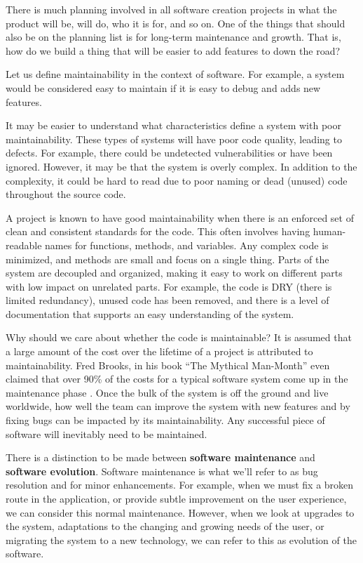 \documentclass[12pt,conference]{IEEEtran}
\begin{document}
There is much planning involved in all software creation projects in what the product will be, will do, who it is for, and so on. One of the things that should also be on the planning list is for long-term maintenance and growth. That is, how do we build a thing that will be easier to add features to down the road?

Let us define maintainability in the context of software. For example, a system would be considered easy to maintain if it is easy to debug and adds new features.

It may be easier to understand what characteristics define a system with poor maintainability. These types of systems will have poor code quality, leading to defects. For example, there could be undetected vulnerabilities or have been ignored. However, it may be that the system is overly complex. In addition to the complexity, it could be hard to read due to poor naming or dead (unused) code throughout the source code.

A project is known to have good maintainability when there is an enforced set of clean and consistent standards for the code. This often involves having human-readable names for functions, methods, and variables. Any complex code is minimized, and methods are small and focus on a single thing. Parts of the system are decoupled and organized, making it easy to work on different parts with low impact on unrelated parts. For example, the code is DRY (there is limited redundancy), unused code has been removed, and there is a level of documentation that supports an easy understanding of the system.

Why should we care about whether the code is maintainable? It is assumed that a large amount of the cost over the lifetime of a project is attributed to maintainability. Fred Brooks, in his book ``The Mythical Man-Month'' even claimed that over 90\% of the costs for a typical software system come up in the maintenance phase \cite{brooks:mythical}. Once the bulk of the system is off the ground and live worldwide, how well the team can improve the system with new features and by fixing bugs can be impacted by its maintainability. Any successful piece of software will inevitably need to be maintained.


There is a distinction to be made between \textbf{software maintenance} and \textbf{software evolution}. Software maintenance is what we'll refer to as bug resolution and for minor enhancements. For example, when we must fix a broken route in the application, or provide subtle improvement on the user experience, we can consider this normal maintenance. However, when we look at upgrades to the system, adaptations to the changing and growing needs of the user, or migrating the system to a new technology, we can refer to this as evolution of the software.
\end{document}
